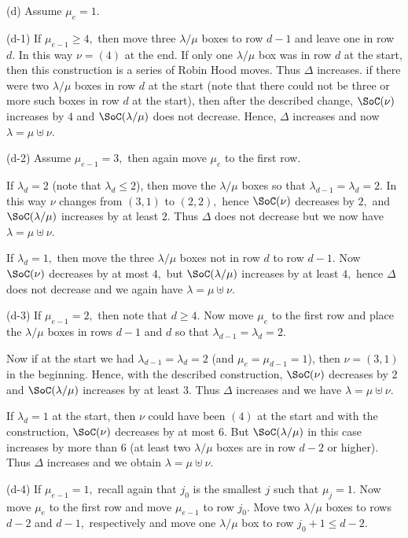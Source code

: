 \documentclass[12pt,dvipsnames,accepted=2016-08-18,a4paper,onecolumn]{quantumarticle}
\def\la{\lambda}
\def\la{\lambda}
\numberwithin{equation}{section}
\theoremstyle{definition}
\begin{document}
(d) Assume $\mu_e=1.$ 

(d-1) If $\mu_{e-1}\geq 4,$ then move  three $\la/\mu$ boxes to row $d-1$ and leave one in row $d.$ In this way $\nu = (4)$ at the end.
If only one $\la/\mu$ box was in row $d$ at the start, then this construction is a series of Robin Hood moves. Thus $\Delta$ increases.
if there were two $\la/\mu$ boxes in row $d$ at the start (note that there could not be three or more such boxes in row $d$ at the start), then after the described change, $\SoC(\nu)$ increases by $4$ and $\SoC(\la/\mu)$ does not decrease. Hence, $\Delta$ increases and now $\la = \mu \uplus \nu$. 


(d-2) Assume $\mu_{e-1}=3,$ then again move $\mu_e$ to the first row.

If $\la_d=2$ (note that $\la_d\leq2$), then move the $\la/\mu$ boxes so that $\la_{d-1}=\la_d=2.$ In this way $\nu$ changes from $(3,1)$ to $(2,2),$ hence $\SoC(\nu)$ decreases by $2,$  and $\SoC(\la/\mu)$ increases by at least $2.$ Thus $\Delta$ does not decrease but we now have $\la = \mu \uplus \nu$. 

If $\la_d=1,$ then move the three $\la/\mu$ boxes not in row $d$ to row $d-1.$ Now $\SoC(\nu)$ decreases by at most $4,$ but  $\SoC(\la/\mu)$ increases by at least $4,$ hence $\Delta$ does not decrease and we again have  $\la = \mu \uplus \nu$. 


(d-3) If $\mu_{e-1} = 2,$ then note that $d \geq 4.$ Now move $\mu_e$ to the first row and place the $\la/\mu$ boxes in rows $d-1$ and $d$ so that $\la_{d-1}=\la_d=2.$  

Now if at the start we had $\la_{d-1}=\la_d=2$ (and $\mu_e=\mu_{d-1}=1$), then $\nu=(3,1)$ in the beginning. Hence, with the described construction,  $\SoC(\nu)$ decreases by $2$ and  $\SoC(\la/\mu)$ increases by at least $3.$ Thus $\Delta$ increases and we  have  $\la = \mu \uplus \nu$. 

If $\la_d=1$ at the start, then $\nu$ could have been $(4)$ at the start and 
with the construction, $\SoC(\nu)$ decreases by at most $6.$ But   $\SoC(\la/\mu)$ in this case increases by more than $6$ (at least two $\la/\mu$ boxes are in row $d-2$ or higher). Thus $\Delta$ increases and we obtain $\la = \mu \uplus \nu$.

(d-4)  If $\mu_{e-1} = 1,$ recall again that $j_0$ is the smallest $j$ such that $\mu_j=1.$ Now move $\mu_e$ to the first row and move $\mu_{e-1}$ to row $j_0.$ Move two $\la/\mu$ boxes to rows $d-2$ and $d-1,$ respectively and move one $\la/\mu$ box to row $j_0+1 \leq d-2.$
\end{document}
